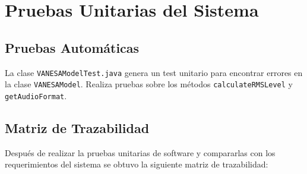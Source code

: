 \documentclass[10pt]{article} %
\begin{document}
\section{Pruebas Unitarias del Sistema}

\subsection{Pruebas Automáticas}
La clase \verb+VANESAModelTest.java+ genera un test unitario para encontrar errores en la clase \verb+VANESAModel+. Realiza pruebas sobre los métodos \verb+calculateRMSLevel+ y \verb+getAudioFormat+.



\subsection{Matriz de Trazabilidad}
Después de realizar la pruebas unitarias de software y compararlas con los requerimientos del sistema se obtuvo la siguiente matriz de trazabilidad:

\begin{figure}[H] %
\label{fig:MatrizDeTrazabilidad}
\end{figure}
\end{document}
